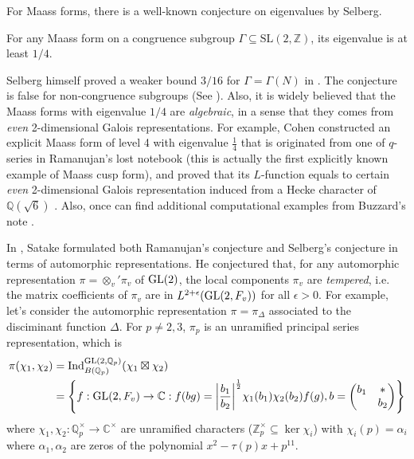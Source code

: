 For Maass forms, there is a well-known conjecture on eigenvalues by Selberg.
\begin{conjecture}
For any Maass form on a congruence subgroup $\Gamma \subseteq \mathrm{SL}(2, \mathbb{Z})$, its eigenvalue is at least $1/4$.
\end{conjecture}
Selberg himself proved a weaker bound $3/16$ for $\Gamma = \Gamma(N)$ in \cite{selberg1965estimation}.
The conjecture is false for non-congruence subgroups (See \cite{sarnak1995selberg}). 
Also, it is widely believed that the Maass forms with eigenvalue $1/4$ are \emph{algebraic}, in a sense that they comes from \emph{even} 2-dimensional Galois representations.
For example, Cohen constructed an explicit Maass form of level 4 with eigenvalue $\frac{1}{4}$
that is originated from one of $q$-series in Ramanujan's lost notebook (this is actually the first explicitly known
example of Maass cusp form),
and proved that its $L$-function equals to certain \emph{even} 2-dimensional Galois representation
induced from a Hecke character of $\mathbb{Q}(\sqrt{6})$ \cite{cohen1988q}.
Also, once can find additional computational examples from Buzzard's note \cite{buzzard2012explicit}.


In \cite{satake1966spherical}, Satake formulated both Ramanujan's conjecture and Selberg's conjecture
in terms of automorphic representations.
He conjectured that, for any automorphic representation $\pi = \otimes_{v}'\pi_{v}$ of $\operatorname{\mathrm{GL}}(2)$,
the local components $\pi_{v}$ are \emph{tempered}, i.e. the matrix coefficients
of $\pi_{v}$ are in $L^{2+\epsilon}(\operatorname{\mathrm{GL}}(2, F_{v}))$ for all $\epsilon > 0$.
For example, let's consider the automorphic representation $\pi = \pi_{\Delta}$ associated
to the disciminant function $\Delta$.
For $p\neq 2, 3$, $\pi_{p}$ is an unramified principal series representation, which is 
\begin{align*}
\pi(\chi_{1}, \chi_{2}) &= \mathrm{Ind}_{B(\mathbb{Q}_{p})}^{\GL(2, \mathbb{Q}_{p})}(\chi_{1}\boxtimes \chi_{2})\\ 
&= \left\{f: \GL(2, F_{v})\to\mathbb{C}:f(bg) = \bigg|\frac{b_{1}}{b_{2}}\bigg|^{\frac{1}{2}}\chi_{1}(b_{1})\chi_{2}(b_{2})f(g),b = \begin{pmatrix}b_{1}&*\\&b_{2}\end{pmatrix}\right\}
\end{align*}
where $\chi_{1}, \chi_{2}: \mathbb{Q}_{p}^{\times}\to \mathbb{C}^{\times}$ are unramified characters ($\mathbb{Z}_{p}^{\times}\subseteq \ker\chi_{i}$)
with $\chi_{i}(p) = \alpha_{i}$ where $\alpha_{1}, \alpha_{2}$ are zeros of the polynomial $x^{2} - \tau(p)x + p^{11}$.


